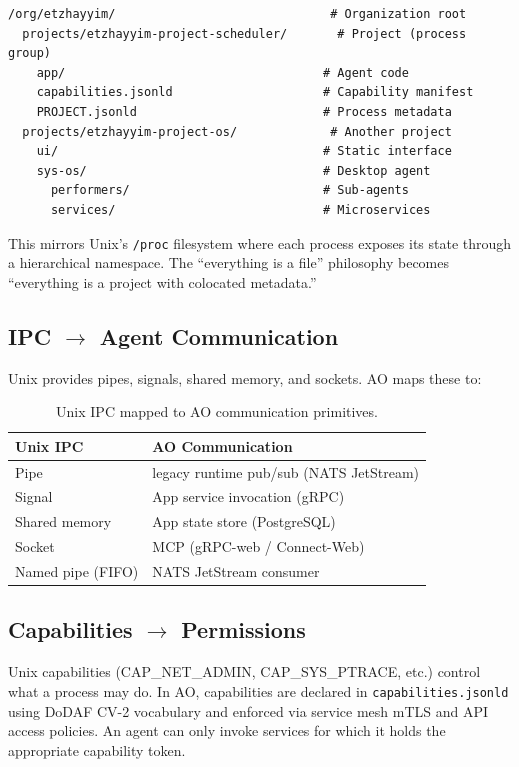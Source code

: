 \documentclass[11pt,a4paper]{article}
\begin{document}
\begin{verbatim}
/org/etzhayyim/                              # Organization root
  projects/etzhayyim-project-scheduler/       # Project (process group)
    app/                                    # Agent code
    capabilities.jsonld                     # Capability manifest
    PROJECT.jsonld                          # Process metadata
  projects/etzhayyim-project-os/             # Another project
    ui/                                     # Static interface
    sys-os/                                 # Desktop agent
      performers/                           # Sub-agents
      services/                             # Microservices
\end{verbatim}

This mirrors Unix's \texttt{/proc} filesystem where each process exposes its
state through a hierarchical namespace. The ``everything is a file''
philosophy becomes ``everything is a project with colocated metadata.''

\subsection{IPC $\rightarrow$ Agent Communication}

Unix provides pipes, signals, shared memory, and sockets. AO maps these to:

\begin{table}[h]
\centering
\begin{tabular}{@{}ll@{}}
\toprule
\textbf{Unix IPC} & \textbf{AO Communication} \\
\midrule
Pipe & legacy runtime pub/sub (NATS JetStream) \\
Signal & App service invocation (gRPC) \\
Shared memory & App state store (PostgreSQL) \\
Socket & MCP (gRPC-web / Connect-Web) \\
Named pipe (FIFO) & NATS JetStream consumer \\
\bottomrule
\end{tabular}
\caption{Unix IPC mapped to AO communication primitives.}
\end{table}

\subsection{Capabilities $\rightarrow$ Permissions}

Unix capabilities (CAP\_NET\_ADMIN, CAP\_SYS\_PTRACE, etc.) control what a
process may do. In AO, capabilities are declared in \texttt{capabilities.jsonld}
using DoDAF CV-2 vocabulary and enforced via service mesh mTLS and API access policies.
An agent can only invoke services for which it holds the appropriate capability
token.
\end{document}
